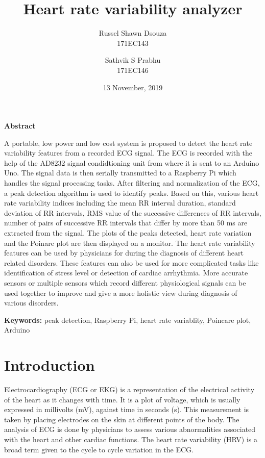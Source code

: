 \documentclass[11pt]{article}
\title{\textbf{Heart rate variability analyzer}}
\author{
  Russel Shawn Dsouza\\
  171EC143
  \and
  Sathvik S Prabhu\\
  171EC146
}
\date{13 November, 2019}
\theoremstyle{definition}
\begin{document}
  \maketitle
  \thispagestyle{empty}

  \newpage
  \begin{center}
  \begin{large}
  \textbf{Abstract}
  \end{large}
  \end{center}

  A portable, low power and low cost system is proposed to detect the heart rate variability features from a recorded ECG signal. The ECG is recorded with the help of the AD8232 signal condidtioning unit from where it is sent to an Arduino Uno. The signal data is then serially transmitted to a Raspberry Pi which handles the signal processing tasks. After filtering and normalization of the ECG, a peak detection algorithm is used to identify peaks. Based on this, various heart rate variability indices including the mean RR interval duration, standard deviation of RR intervals, RMS value of the successive differences of RR intervals, number of pairs of successive RR intervals that differ by more than 50 ms are extracted from the signal. The plots of the peaks detected, heart rate variation and the Poinare plot are then displayed on a monitor. The heart rate variability features can be used by physicians for during the diagnosis of different heart related disorders. These features can also be used for more complicated tasks like identification of stress level or detection of cardiac arrhythmia. More accurate sensors or  multiple sensors which record different physiological signals can be used together to improve and give a more holistic view during diagnosis of various disorders.
  
  \textbf{Keywords:} peak detection, Raspberry Pi, heart rate variablity, Poincare plot, Arduino

  
  \newpage
  \tableofcontents
  \thispagestyle{empty}

  \setcounter{page}{1}
  \newpage
  \section{Introduction}
  Electrocardiography (ECG or EKG) is a representation of the electrical activity of the heart as it changes with time. It is a plot of voltage, which is usually expressed in millivolts (mV), against time in seconds (s). This measurement is taken by placing electrodes on the skin at different points of the body. The analysis of ECG is done by physicians to assess various abnormalities associated with the heart and other cardiac functions. The heart rate variability (HRV) is a broad term given to the cycle to cycle variation in the ECG.
\end{document}
